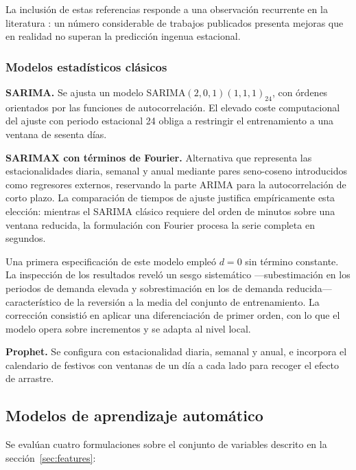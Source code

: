 La inclusión de estas referencias responde a una observación recurrente en la
literatura \parencite{hong2016probabilistic}: un número considerable de trabajos
publicados presenta mejoras que en realidad no superan la predicción ingenua
estacional.

\subsubsection*{Modelos estadísticos clásicos}

\textbf{SARIMA.} Se ajusta un modelo SARIMA$(2,0,1)(1,1,1)_{24}$, con órdenes
orientados por las funciones de autocorrelación. El elevado coste computacional
del ajuste con periodo estacional 24 obliga a restringir el entrenamiento a una
ventana de sesenta días.

\textbf{SARIMAX con términos de Fourier.} Alternativa que representa las
estacionalidades diaria, semanal y anual mediante pares seno-coseno introducidos
como regresores externos, reservando la parte ARIMA para la autocorrelación de
corto plazo. La comparación de tiempos de ajuste justifica empíricamente esta
elección: mientras el SARIMA clásico requiere del orden de minutos sobre una
ventana reducida, la formulación con Fourier procesa la serie completa en
segundos.

Una primera especificación de este modelo empleó $d=0$ sin término constante. La
inspección de los resultados reveló un sesgo sistemático —subestimación en los
periodos de demanda elevada y sobrestimación en los de demanda reducida—
característico de la reversión a la media del conjunto de entrenamiento. La
corrección consistió en aplicar una diferenciación de primer orden, con lo que el
modelo opera sobre incrementos y se adapta al nivel local.

\textbf{Prophet.} Se configura con estacionalidad diaria, semanal y anual, e
incorpora el calendario de festivos con ventanas de un día a cada lado para
recoger el efecto de arrastre.

\subsection{Modelos de aprendizaje automático}

Se evalúan cuatro formulaciones sobre el conjunto de variables descrito en la
sección~\ref{sec:features}:

